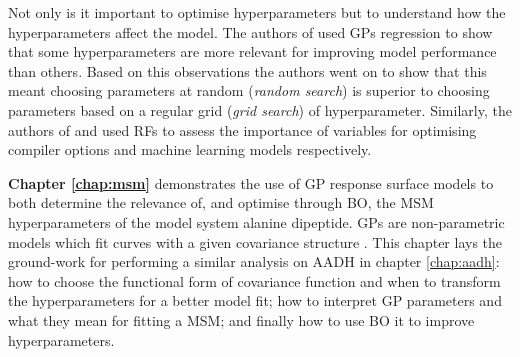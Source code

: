 Not only is it important to optimise hyperparameters but to understand how the hyperparameters affect the model. The authors of \cite{bergstrajamesbergstraRandomSearchHyperParameter2012} used GPs regression to show that some hyperparameters are more relevant for improving model performance than others. Based on this observations the authors went on to show that this meant choosing parameters at random (\emph{random search}) is superior to choosing parameters based on a regular grid (\emph{grid search}) of hyperparameter. Similarly, the authors of  \cite{gramacyVariableSelectionSensitivity2013} and \cite{pmlr-v32-hutter14} used  RFs to assess the importance of variables for optimising compiler options and machine learning models respectively. 

\textbf{Chapter \ref{chap:msm}} demonstrates the use of GP response surface models to both determine the relevance of, and optimise through BO, the MSM hyperparameters of the model system alanine dipeptide. GPs are non-parametric models which fit curves with a given covariance structure \cite{rasmussenGaussianProcessesMachine2006}. This chapter lays the ground-work for performing a similar analysis on AADH in chapter \ref{chap:aadh}: how to choose the functional form of covariance function and when to transform the hyperparameters for a better model fit; how to interpret GP parameters and what they mean for fitting a MSM; and finally how to use BO it to improve hyperparameters. 

